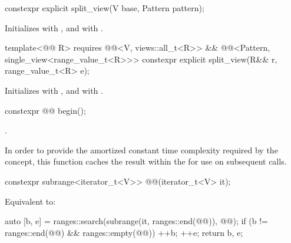 \begin{itemdecl}
constexpr explicit split_view(V base, Pattern pattern);
\end{itemdecl}

\begin{itemdescr}
\pnum
\effects
Initializes  with , and
 with .
\end{itemdescr}

%
\begin{itemdecl}
template<@@ R>
  requires @@<V, views::all_t<R>> &&
           @@<Pattern, single_view<range_value_t<R>>>
constexpr explicit split_view(R&& r, range_value_t<R> e);
\end{itemdecl}

\begin{itemdescr}
\pnum
\effects
Initializes  with , and
 with .
\end{itemdescr}

\begin{itemdecl}
constexpr @@ begin();
\end{itemdecl}

\begin{itemdescr}
\pnum
\returns
{}.

\pnum
\remarks
In order to provide the amortized constant time complexity
required by the  concept,
this function caches the result within the 
for use on subsequent calls.
\end{itemdescr}

\begin{itemdecl}
constexpr subrange<iterator_t<V>> @@(iterator_t<V> it);
\end{itemdecl}

\begin{itemdescr}
\pnum
\effects
Equivalent to:
\begin{codeblock}
auto [b, e] = ranges::search(subrange(it, ranges::end(@@)), @@);
if (b != ranges::end(@@) && ranges::empty(@@)) {
  ++b;
  ++e;
}
return {b, e};
\end{codeblock}
\end{itemdescr}


